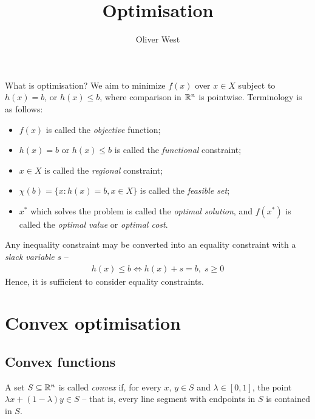 \documentclass{../template/note}
\author{Oliver West}
\title{Optimisation}
\date{}
\begin{document}
    \maketitle

    \tableofcontents


    What is optimisation? We aim to minimize $f(x)$ over $x \in X$ subject to $h(x) = b$, or $h(x) \leq b$, where comparison in $\mathbb R^n$ is pointwise. Terminology is as follows:

    \begin{itemize}
        \item $f(x)$ is called the \emph{objective} function;
        \item $h(x) = b$ or $h(x) \leq b$ is called the \emph{functional} constraint;
        \item $x \in X$ is called the \emph{regional} constraint;
        \item $\chi(b) = \{x: h(x) = b, x \in X\}$ is called the \emph{feasible set};
        \item $x^*$ which solves the problem is called the \emph{optimal solution}, and $f(x^*)$ is called the \emph{optimal value} or \emph{optimal cost}.
    \end{itemize}
    
    \begin{proposition}
        Any inequality constraint may be converted into an equality constraint with a \emph{slack variable} $s$ --
        \begin{align*}
            h(x) \leq b \iff h(x) + s = b,\; s \geq 0
        \end{align*}
        Hence, it is sufficient to consider equality constraints.
    \end{proposition}

    \section{Convex optimisation}

    \subsection{Convex functions}

    \begin{definition}
        A set $S \subseteq \mathbb R^n$ is called \emph{convex} if, for every $x$, $y \in S$ and $\lambda \in [0, 1]$, the point $\lambda x + (1-\lambda)y \in S$ -- that is, every line segment with endpoints in $S$ is contained in $S$.
    \end{definition}
    
\end{document}
